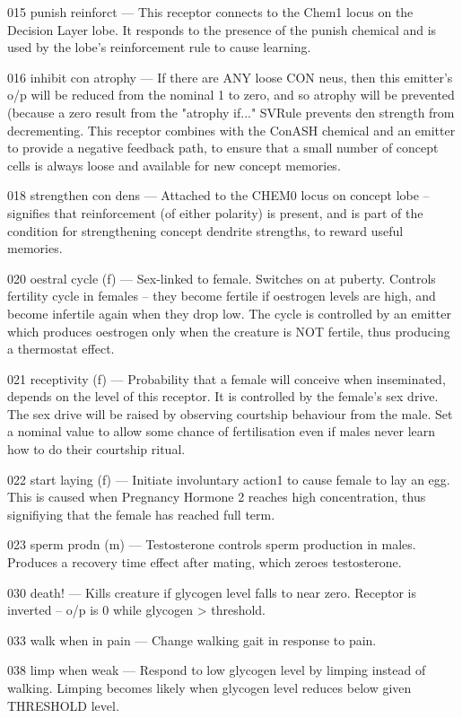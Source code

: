 \documentclass[11pt,twoside,a4paper]{article}
\begin{document}
015 punish reinforct --- This receptor connects to the Chem1 locus on the Decision Layer lobe. It responds to the presence of the punish chemical and is used by the lobe's reinforcement rule to cause learning.

016 inhibit con atrophy --- If there are ANY loose CON neus, then this emitter's o/p will be reduced from the nominal 1 to zero, and so atrophy will be prevented (because a zero result from the "atrophy if..." SVRule prevents den strength from decrementing. This receptor combines with the ConASH chemical and an emitter to provide a negative feedback path, to ensure that a small number of concept cells is always loose and available for new concept memories.

018 strengthen con dens --- Attached to the CHEM0 locus on concept lobe -- signifies that reinforcement (of either polarity) is present, and is part of the condition for strengthening concept dendrite strengths, to reward useful memories.

020 oestral cycle (f) --- Sex-linked to female. Switches on at puberty. Controls fertility cycle in females -- they become fertile if oestrogen levels are high, and become infertile again when they drop low. The cycle is controlled by an emitter which produces oestrogen only when the creature is NOT fertile, thus producing a thermostat effect.

021 receptivity (f) --- Probability that a female will conceive when inseminated, depends on the level of this receptor. It is controlled by the female's sex drive. The sex drive will be raised by observing courtship behaviour from the male. Set a nominal value to allow some chance of fertilisation even if males never learn how to do their courtship ritual.

022 start laying (f) --- Initiate involuntary action1 to cause female to lay an egg. This is caused when Pregnancy Hormone 2 reaches high concentration, thus signifiying that the female has reached full term.

023 sperm prodn (m) --- Testosterone controls sperm production in males. Produces a recovery time effect after mating, which zeroes testosterone.

030 death! --- Kills creature if glycogen level falls to near zero. Receptor is inverted -- o/p is 0 while glycogen > threshold.

033 walk when in pain --- Change walking gait in response to pain.

038 limp when weak --- Respond to low glycogen level by limping instead of walking. Limping becomes likely when glycogen level reduces below given THRESHOLD level.
\end{document}
